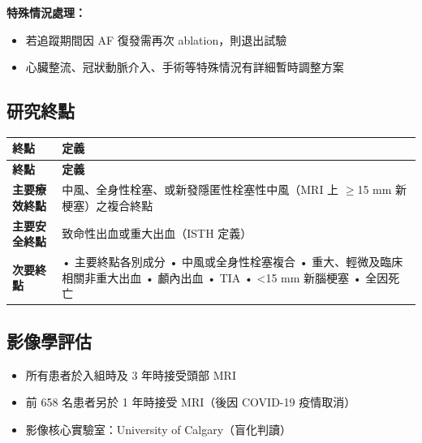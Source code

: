 \documentclass[12pt,a4paper]{article}
\begin{document}
\textbf{特殊情況處理：}
\begin{itemize}
    \item 若追蹤期間因 AF 復發需再次 ablation，則退出試驗
    \item 心臟整流、冠狀動脈介入、手術等特殊情況有詳細暫時調整方案
\end{itemize}

\subsection{研究終點}

\begin{longtable}{p{4cm}p{10cm}}
\toprule
\textbf{終點} & \textbf{定義} \\
\midrule
\endfirsthead
\toprule
\textbf{終點} & \textbf{定義} \\
\midrule
\endhead
\bottomrule
\endfoot

\textbf{主要療效終點} &
中風、全身性栓塞、或新發隱匿性栓塞性中風（MRI 上 $\geq$15 mm 新梗塞）之複合終點 \\
\midrule

\textbf{主要安全終點} &
致命性出血或重大出血（ISTH 定義） \\
\midrule

\textbf{次要終點} &
• 主要終點各別成分\newline
• 中風或全身性栓塞複合\newline
• 重大、輕微及臨床相關非重大出血\newline
• 顱內出血\newline
• TIA\newline
• <15 mm 新腦梗塞\newline
• 全因死亡 \\
\bottomrule
\end{longtable}

\subsection{影像學評估}

\begin{itemize}
    \item 所有患者於入組時及 3 年時接受頭部 MRI
    \item 前 658 名患者另於 1 年時接受 MRI（後因 COVID-19 疫情取消）
    \item 影像核心實驗室：University of Calgary（盲化判讀）
\end{itemize}

\end{document}
